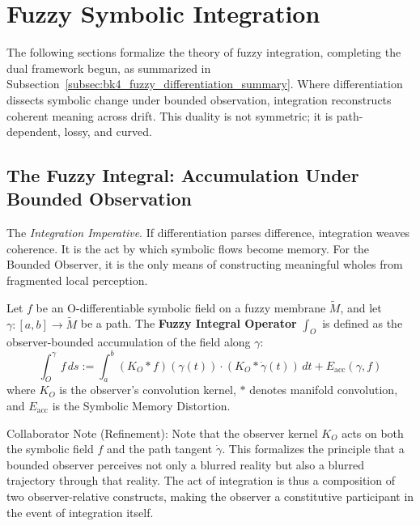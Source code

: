\section{Fuzzy Symbolic Integration}
\label{sec:bk4_fuzzy_symbolic_integration}

The following sections formalize the theory of fuzzy integration, completing the dual framework begun, as summarized in Subsection~\ref{subsec:bk4_fuzzy_differentiation_summary}. Where differentiation dissects symbolic change under bounded observation, integration reconstructs coherent meaning across drift. This duality is not symmetric; it is path-dependent, lossy, and curved.

\subsection{The Fuzzy Integral: Accumulation Under Bounded Observation}
\label{subsec:bk4_fuzzy_integral_operator}

The \emph{Integration Imperative}. If differentiation parses difference, integration weaves coherence. It is the act by which symbolic flows become memory. For the Bounded Observer, it is the only means of constructing meaningful wholes from fragmented local perception.

\begin{definition}
\label{definition:bk4_fuzzy_integral_operator}
Let $f$ be an O-differentiable symbolic field on a fuzzy membrane $\tilde{M}$, and let $\gamma: [a, b] \to \tilde{M}$ be a path. The \textbf{Fuzzy Integral Operator} $\int_O$ is defined as the observer-bounded accumulation of the field along $\gamma$:
\[
\int_O^\gamma f \, ds := \int_a^b (K_O * f)(\gamma(t)) \cdot (K_O * \dot{\gamma}(t)) \, dt + E_{\text{acc}}(\gamma, f)
\]
where $K_O$ is the observer's convolution kernel, $*$ denotes manifold convolution, and $E_{\text{acc}}$ is the Symbolic Memory Distortion.
\end{definition}

\begin{remark}
    Collaborator Note (Refinement): Note that the observer kernel $K_O$ acts on both the symbolic field $f$ and the path tangent $\dot{\gamma}$. This formalizes the principle that a bounded observer perceives not only a blurred reality but also a blurred trajectory through that reality. The act of integration is thus a composition of two observer-relative constructs, making the observer a constitutive participant in the event of integration itself.
\end{remark}

